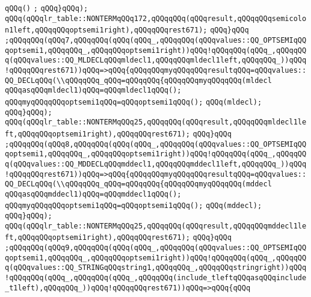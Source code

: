 \verb|qQQq()|\newline
\verb|;|\newline
\verb|qQQq}qQQq);|\newline
\verb|qQQq(qQQqlr_table::NONTERMqQQq172,qQQqqQQq(qQQqresult,qQQqqQQqsemicolon1left,qQQqqQQqoptsemi1right),qQQqqQQqrest671);|\newline
\verb|qQQq}qQQq|\newline
\verb|;qQQqqQQq(qQQq7,qQQqqQQq(qQQq(qQQq_,qQQqqQQq(qQQqvalues::QQ_OPTSEMIqQQqoptsemi1,qQQqqQQq_,qQQqqQQqoptsemi1right))qQQq!qQQqqQQq(qQQq_,qQQqqQQq(qQQqvalues::QQ_MLDECLqQQqmldecl1,qQQqqQQqmldecl1left,qQQqqQQq_))qQQq!qQQqqQQqrest671))qQQq=>qQQq{qQQqqQQqmyqQQqqQQqresultqQQq=qQQqvalues::QQ_DECLqQQq(\\qQQqqQQq_qQQq=qQQqqQQq{qQQqqQQqmyqQQqqQQq(mldecl|\newline
\verb|qQQqasqQQqmldecl1)qQQq=qQQqmldecl1qQQq();|\newline
\verb|qQQqmyqQQqqQQqoptsemi1qQQq=qQQqoptsemi1qQQq();|\newline
\verb|qQQq(mldecl);|\newline
\verb|qQQq}qQQq);|\newline
\verb|qQQq(qQQqlr_table::NONTERMqQQq25,qQQqqQQq(qQQqresult,qQQqqQQqmldecl1left,qQQqqQQqoptsemi1right),qQQqqQQqrest671);|\newline
\verb|qQQq}qQQq|\newline
\verb|;qQQqqQQq(qQQq8,qQQqqQQq(qQQq(qQQq_,qQQqqQQq(qQQqvalues::QQ_OPTSEMIqQQqoptsemi1,qQQqqQQq_,qQQqqQQqoptsemi1right))qQQq!qQQqqQQq(qQQq_,qQQqqQQq(qQQqvalues::QQ_MDDECLqQQqmddecl1,qQQqqQQqmddecl1left,qQQqqQQq_))qQQq!qQQqqQQqrest671))qQQq=>qQQq{qQQqqQQqmyqQQqqQQqresultqQQq=qQQqvalues::QQ_DECLqQQq(\\qQQqqQQq_qQQq=qQQqqQQq{qQQqqQQqmyqQQqqQQq(mddecl|\newline
\verb|qQQqasqQQqmddecl1)qQQq=qQQqmddecl1qQQq();|\newline
\verb|qQQqmyqQQqqQQqoptsemi1qQQq=qQQqoptsemi1qQQq();|\newline
\verb|qQQq(mddecl);|\newline
\verb|qQQq}qQQq);|\newline
\verb|qQQq(qQQqlr_table::NONTERMqQQq25,qQQqqQQq(qQQqresult,qQQqqQQqmddecl1left,qQQqqQQqoptsemi1right),qQQqqQQqrest671);|\newline
\verb|qQQq}qQQq|\newline
\verb|;qQQqqQQq(qQQq9,qQQqqQQq(qQQq(qQQq_,qQQqqQQq(qQQqvalues::QQ_OPTSEMIqQQqoptsemi1,qQQqqQQq_,qQQqqQQqoptsemi1right))qQQq!qQQqqQQq(qQQq_,qQQqqQQq(qQQqvalues::QQ_STRINGqQQqstring1,qQQqqQQq_,qQQqqQQqstringright))qQQq!qQQqqQQq(qQQq_,qQQqqQQq(qQQq_,qQQqqQQq(include_tleftqQQqasqQQqinclude_t1left),qQQqqQQq_))qQQq!qQQqqQQqrest671))qQQq=>qQQq{qQQq|\newline
